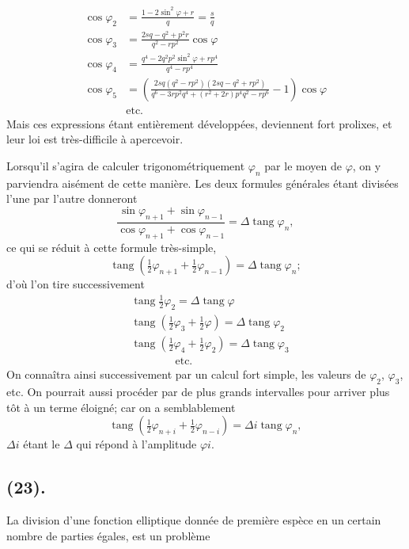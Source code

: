 \documentclass{article}
\begin{document}
\[ \begin{aligned} \cos\varphi_{2} &= \frac{1-2\sin^{2}\varphi+r}{q}=\frac{s}{q} \\ \cos\varphi_{3} &= \frac{2sq-q^{2}+p^{2}r}{q^{2}-rp^{2}}\cos\varphi \\ \cos\varphi_{4} &= \frac{q^{4}-2q^{2}p^{2}\sin^{2}\varphi+rp^{4}}{q^{4}-rp^{4}} \\ \cos\varphi_{5} &= \left(\frac{2sq(q^{2}-rp^{2})(2sq-q^{2}+rp^{2})}{q^{6}-3rp^{2}q^{4}+(r^{2}+2r)p^{4}q^{2}-rp^{6}}-1\right)\cos\varphi \\ &\text{etc.} \end{aligned} \]
Mais ces expressions étant entièrement développées, deviennent fort prolixes, et leur loi est très-difficile à apercevoir.

Lorsqu'il s'agira de calculer trigonométriquement $\varphi_{n}$ par le moyen de $\varphi$, on y parviendra aisément de cette manière. Les deux formules générales étant divisées l'une par l'autre donneront
\[ \frac{\sin\varphi_{n+1}+\sin\varphi_{n-1}}{\cos\varphi_{n+1}+\cos\varphi_{n-1}}=\Delta\operatorname{tang}\varphi_{n}, \]
ce qui se réduit à cette formule très-simple,
\[ \operatorname{tang}(\tfrac{1}{2}\varphi_{n+1}+\tfrac{1}{2}\varphi_{n-1})=\Delta\operatorname{tang}\varphi_{n}; \]
d'où l'on tire successivement
\[ \begin{aligned} &\operatorname{tang}\tfrac{1}{2}\varphi_{2}=\Delta\operatorname{tang}\varphi \\ &\operatorname{tang}(\tfrac{1}{2}\varphi_{3}+\tfrac{1}{2}\varphi)=\Delta\operatorname{tang}\varphi_{2} \\ &\operatorname{tang}(\tfrac{1}{2}\varphi_{4}+\tfrac{1}{2}\varphi_{2})=\Delta\operatorname{tang}\varphi_{3} \\ &\qquad\qquad\text{etc.} \end{aligned} \]
On connaîtra ainsi successivement par un calcul fort simple, les valeurs de $\varphi_{2}$, $\varphi_{3}$, etc. On pourrait aussi procéder par de plus grands intervalles pour arriver plus tôt à un terme éloigné; car on a semblablement
\[ \operatorname{tang}(\tfrac{1}{2}\varphi_{n+i}+\tfrac{1}{2}\varphi_{n-i})=\Delta i\operatorname{tang}\varphi_{n}, \]
$\Delta i$ étant le $\Delta$ qui répond à l'amplitude $\varphi i$.

\subsection*{(23).}

La division d'une fonction elliptique donnée de première espèce en un certain nombre de parties égales, est un problème
\end{document}
